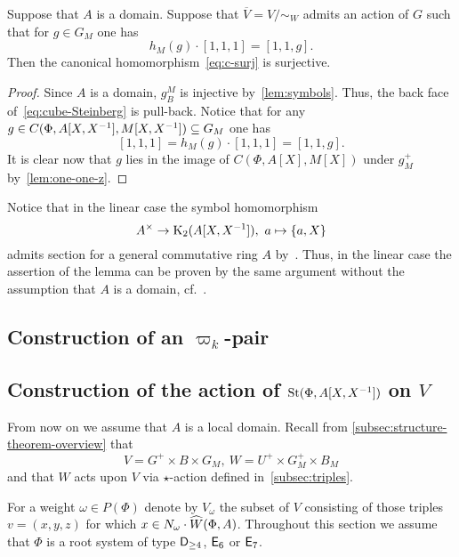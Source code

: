 \begin{lemma} \label{lem:second-reduction}
    Suppose that $A$ is a domain.
    Suppose that $\overline{V} = V/\sim_W$ admits an action of $G$ such that
      for $g \in G_M$ one has \[ h_M(g) \cdot [1, 1, 1] = [1, 1, g]. \]
    Then the canonical homomorphism~\eqref{eq:c-surj} is surjective.
\end{lemma}
\begin{proof}
  Since $A$ is a domain, $g^M_B$ is injective by~\cref{lem:symbols}.
    Thus, the back face of~\eqref{eq:cube-Steinberg} is pull-back.
  Notice that for any $g \in C(\Phi, A[X, X^{-1}], M[X, X^{-1}]) \subseteq G_M$ one has
    \[ [1, 1, 1] = h_M(g) \cdot [1, 1, 1] = [1, 1, g].\]
  It is clear now that $g$ lies in the image of $C(\Phi, A[X], M[X])$ under $g^+_M$ by~\cref{lem:one-one-z}.
\end{proof}

\begin{rem}
    Notice that in the linear case the symbol homomorphism \[A^\times \to \operatorname{K}_2(A[X, X^{-1}]),\ a \mapsto \{a, X\}\] admits section
     for a general commutative ring $A$ by~\cite{Wa71}.
    Thus, in the linear case the assertion of the lemma can be proven by the same argument without the assumption that $A$ is a domain, cf.~\cite[Lemma~3.1g]{Tu83}.
\end{rem}

\subsection{Construction of an $\varpi_k$-pair} \label{subsec:construction-sigma}


\subsection{Construction of the action of $\operatorname{St}(\Phi, A[X, X^{-1}])$ on $V$} \label{sec:construction-delta}
From now on we assume that $A$ is a local domain.
Recall from \cref{subsec:structure-theorem-overview} that \[V = G^+ \times B \times G_M,\ W = U^+ \times G_M^+ \times B_M\]
and that $W$ acts upon $V$ via $\star$-action defined in~\cref{subsec:triples}.

For a weight $\omega \in P(\Phi)$ denote by $V_\omega$ the subset of $V$ consisting of those triples $v = (x, y, z)$ for which $x \in N_\omega\cdot \widehat{W}(\Phi, A)$.
Throughout this section we assume that $\Phi$ is a root system of type $\mathsf{D}_{\geq 4}$, $\mathsf{E}_6$ or $\mathsf{E}_7$.

